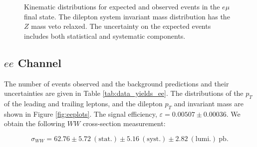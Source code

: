 \begin{figure}[!hbtp]
\begin{center}
\caption{Kinematic distributions for expected and observed events in the $e\mu$ final state.
The dilepton system invariant mass distribution has the $Z$ mass veto relaxed.
The uncertainty on the expected events includes both statistical and systematic components.}
\label{fig:emplots}
\end{center}
\end{figure}

%
%
%
\clearpage
\subsection{$ee$ Channel}

The number of events observed and the background predictions and their uncertainties are
given in Table \ref{tab:data_yields_ee}.
The distributions of the $p_{T}$ of the leading and trailing leptons, and the dilepton $p_{T}$
and invariant mass are shown in Figure \ref{fig:eeplots}.
The signal efficiency,  $\varepsilon = 0.00507 \pm 0.00036$.
We obtain the following $WW$ cross-section measurement:

\begin{equation*}
\sigma_{WW}  = 62.76 \pm 5.72~\mathrm{(stat.)} \pm 5.16~\mathrm{(syst.)} \pm 2.82~\mathrm{(lumi.)~pb}.
\end{equation*}

